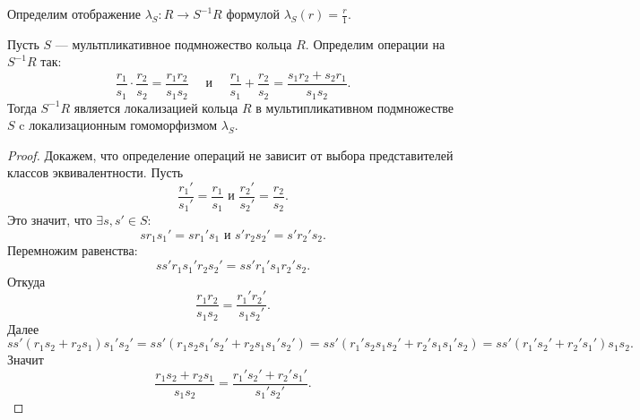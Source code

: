 \documentclass[11pt]{book}
\theoremstyle{definition}
\theoremstyle{plain}
\theoremstyle{plain}
\theoremstyle{definition}
\theoremstyle{remark}
\begin{document}
Определим отображение $ \lambda_S: R \to  S^{-1}R$ формулой $ \lambda_S(r) = \frac{r}{1}$.
\begin{thm}
    Пусть $ S$ --- мультпликативное подмножество кольца  $ R$. Определим операции на  $ S^{-1}R$ так:
    \[
	\frac{r_1}{s_1} \cdot \frac{r_2}{s_2} = \frac{r_1r_2}{s_1s_2} \quad \text{ и } \quad  \frac{r_1}{s_1} + \frac{r_2}{s_2} = \frac{s_1r_2 + s_2r_1}{s_1s_2}
    .\]
    Тогда $ S^{-1}R$ является локализацией кольца $ R$ в мультипликативном подмножестве   $ S$ c локализационным гомоморфизмом  $ \lambda_S$.
\end{thm}
\begin{proof}
    Докажем, что определение операций не зависит от выбора представителей классов эквивалентности. Пусть \[
	\frac{r_1'}{s_1'} = \frac{r_1}{s_1} \text{ и } \frac{r_2'}{s_2'} = \frac{r_2}{s_2}
    .\]
    Это значит, что $ \exists s, s' \in S:$
    \[
	sr_1 s_1' = s r_1' s_1 \text{ и } s'r_2s_2' = s' r_2' s_2
    .\]
    Перемножим равенства:
    \[
	ss'r_1s_1'r_2s_2' = ss'r_1's_1r_2's_2
    .\]
    Откуда
    \[
	\frac{r_1r_2}{s_1s_2} = \frac{r_1'r_2'}{s_1s_2'}
    .\]
    Далее
    \[
	ss'(r_1s_2 + r_2s_1)s_1's_2' = ss'(r_1s_2s_1's_2'+r_2s_1s_1's_2') = ss'(r_1's_2s_1s_2'+r_2's_1s_1's_2) = ss'(r_1's_2'+r_2's_1')s_1s_2
    .\]
    Значит
    \[
	\frac{r_1s_2+r_2s_1}{s_1s_2} = \frac{r_1's_2'+r_2's_1'}{s_1's_2'}
    .\]


\end{proof}
\end{document}
